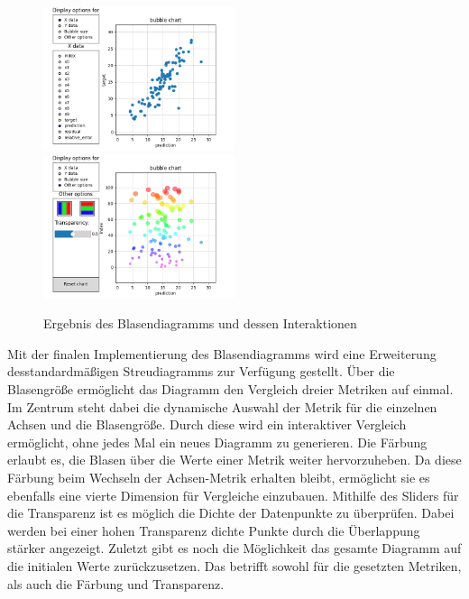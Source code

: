\begin{figure}[H]
    \includegraphics[width=0.5\textwidth]{images/exm_bubblechart.png}
    \hfill
    \includegraphics[width=0.5\textwidth]{images/exm_bubblechart_interacted.png}
    \caption{Ergebnis des Blasendiagramms und dessen Interaktionen}
    \label{fig:eval_bubble_chart}
\end{figure}

\noindent Mit der finalen Implementierung des Blasendiagramms wird eine Erweiterung des\linebreak standardmäßigen Streudiagramms zur Verfügung gestellt. Über die Blasengröße ermöglicht das Diagramm den Vergleich dreier Metriken auf einmal. Im Zentrum steht dabei die dynamische Auswahl der Metrik für die einzelnen Achsen und die Blasengröße. Durch diese wird ein interaktiver Vergleich ermöglicht, ohne jedes Mal ein neues Diagramm zu generieren. Die Färbung erlaubt es, die Blasen über die Werte einer Metrik weiter hervorzuheben. Da diese Färbung beim Wechseln der Achsen-Metrik erhalten bleibt, ermöglicht sie es ebenfalls eine vierte Dimension für Vergleiche einzubauen. Mithilfe des Sliders für die Transparenz ist es möglich die Dichte der Datenpunkte zu überprüfen. Dabei werden bei einer hohen Transparenz dichte Punkte durch die Überlappung stärker angezeigt. Zuletzt gibt es noch die Möglichkeit das gesamte Diagramm auf die initialen Werte zurückzusetzen. Das betrifft sowohl für die gesetzten Metriken, als auch die Färbung und Transparenz.


